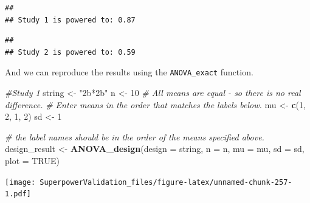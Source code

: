 \documentclass[]{book}
\newenvironment{Shaded}{\begin{snugshade}}{\end{snugshade}}
\newcommand{\CommentTok}[1]{\textcolor[rgb]{0.56,0.35,0.01}{\textit{#1}}}
\newcommand{\DataTypeTok}[1]{\textcolor[rgb]{0.13,0.29,0.53}{#1}}
\newcommand{\DecValTok}[1]{\textcolor[rgb]{0.00,0.00,0.81}{#1}}
\newcommand{\FloatTok}[1]{\textcolor[rgb]{0.00,0.00,0.81}{#1}}
\newcommand{\KeywordTok}[1]{\textcolor[rgb]{0.13,0.29,0.53}{\textbf{#1}}}
\newcommand{\NormalTok}[1]{#1}
\newcommand{\OperatorTok}[1]{\textcolor[rgb]{0.81,0.36,0.00}{\textbf{#1}}}
\newcommand{\OtherTok}[1]{\textcolor[rgb]{0.56,0.35,0.01}{#1}}
\newcommand{\StringTok}[1]{\textcolor[rgb]{0.31,0.60,0.02}{#1}}
\begin{document}
\begin{verbatim}
## 
## Study 1 is powered to: 0.87
\end{verbatim}

\begin{verbatim}
## 
## Study 2 is powered to: 0.59
\end{verbatim}

And we can reproduce the results using the \texttt{ANOVA\_exact} function.

\begin{Shaded}
\begin{Highlighting}[]
\CommentTok{#Study 1}
\NormalTok{string <-}\StringTok{ "2b*2b"}
\NormalTok{n <-}\StringTok{ }\DecValTok{10}
\CommentTok{# All means are equal - so there is no real difference.}
\CommentTok{# Enter means in the order that matches the labels below.}
\NormalTok{mu <-}\StringTok{ }\KeywordTok{c}\NormalTok{(}\DecValTok{1}\NormalTok{, }\DecValTok{2}\NormalTok{, }\DecValTok{1}\NormalTok{, }\DecValTok{2}\NormalTok{) }
\NormalTok{sd <-}\StringTok{ }\DecValTok{1}

\CommentTok{# the label names should be in the order of the means specified above.}
\NormalTok{design_result <-}\StringTok{ }\KeywordTok{ANOVA_design}\NormalTok{(}\DataTypeTok{design =}\NormalTok{ string,}
                   \DataTypeTok{n =}\NormalTok{ n, }
                   \DataTypeTok{mu =}\NormalTok{ mu, }
                   \DataTypeTok{sd =}\NormalTok{ sd, }
                   \DataTypeTok{plot =} \OtherTok{TRUE}\NormalTok{)}
\end{Highlighting}
\end{Shaded}

\texttt{[image: SuperpowerValidation\_files/figure-latex/unnamed-chunk-257-1.pdf]}

\begin{Shaded}
\end{Shaded}
\end{document}
